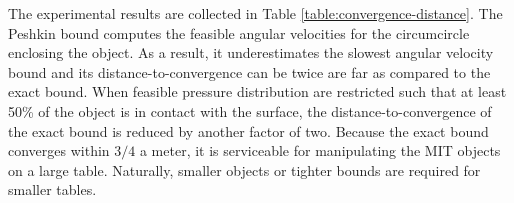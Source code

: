 \documentclass[conference]{IEEEtran}
\begin{document}
The experimental results are collected in Table
\ref{table:convergence-distance}. 
The Peshkin bound computes the feasible angular velocities for the
circumcircle enclosing the object. As a result, it underestimates the
slowest angular velocity bound and its distance-to-convergence can be
twice are far as compared to the exact bound.  When feasible pressure
distribution are restricted such that at least 50\% of the object is
in contact with the surface, the distance-to-convergence of the exact
bound is reduced by another factor of two. Because the exact bound
converges within $3/4$ a meter, it is serviceable for manipulating the
MIT objects on a large table. Naturally, smaller objects or tighter
bounds are required for smaller tables. 
\end{document}
